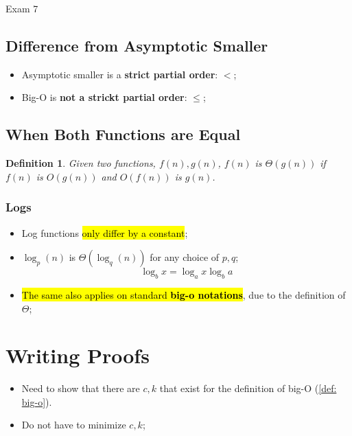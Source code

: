 \documentclass{note}
\newtheorem{definition}{Definition}
\begin{document}
\begin{note}{Exam 7}
    \subsection{Difference from Asymptotic Smaller}

    \begin{itemize}
        \item Asymptotic smaller is a \textbf{strict partial order}: $ < $;
        \item Big-O is \textbf{not a strickt partial order}: $ \leq $;
    \end{itemize}

    \subsection{When Both Functions are Equal}

    \begin{definition}
        Given two functions, $ f(n), g(n) $, $ f(n) $ is $ \Theta(g(n)) $ if $ f(n) $ is $ O(g(n)) $ and
        $ O(f(n)) $ is $ g(n) $.
    \end{definition}

        \subsubsection{Logs}

        \begin{itemize}
            \item Log functions \hl{only differ by a constant};
            \item $ \log_{p} (n) $ is $ \Theta \left( \log_{q}(n) \right) $ for any choice of $ p,q $;
		\begin{equation}
		    \log_{b} x = \log_{a} x \log_{b} a
		\end{equation}
            \item \hl{The same also applies on standard \textbf{big-o notations}}, due to the definition of $ \Theta $;
        \end{itemize}

\section{Writing Proofs}

\begin{itemize}
    \item Need to show that there are $ c, k $ that exist for the definition of big-O (\ref{def: big-o}).
    \item Do not have to minimize $ c, k $;
\end{itemize}


\end{note}
\end{document}
